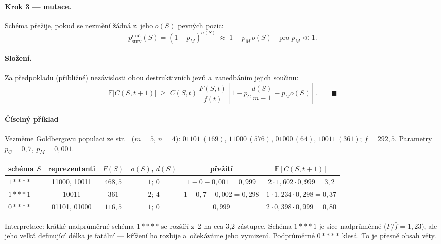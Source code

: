 \documentclass[11pt,a4paper]{article}
\theoremstyle{definition}
\begin{document}
\paragraph{Krok 3 --- mutace.} Schéma přežije, pokud se nezmění žádná z~jeho
$o(S)$ pevných pozic:
\[
p_{\mathrm{surv}}^{\mathrm{mut}}(S) = (1-p_M)^{o(S)} \;\approx\; 1 - p_M\,o(S)
\quad \text{pro } p_M \ll 1 .
\]

\paragraph{Složení.} Za předpokladu (přibližné) nezávislosti obou destruktivních
jevů a~zanedbáním jejich součinu:
\[
\mathbb{E}\big[C(S,t+1)\big] \;\ge\; C(S,t)\,\frac{F(S,t)}{\bar f(t)}
\left[1 - p_C \frac{d(S)}{m-1} - p_M o(S)\right]. \qquad\blacksquare
\]

\paragraph{Číselný příklad}

Vezměme Goldbergovu populaci ze str.~\pageref{ex:goldberg} ($m=5$, $n=4$):
$01101\,(169)$, $11000\,(576)$, $01000\,(64)$, $10011\,(361)$;
$\bar f = 292{,}5$. Parametry $p_C = 0{,}7$, $p_M = 0{,}001$.

\begin{center}
\begin{tabular}{@{}lccccc@{}}
\toprule
schéma $S$ & reprezentanti & $F(S)$ & $o(S)$, $d(S)$ & přežití & $\mathbb{E}[C(S,t{+}1)]$ \\
\midrule
$1{*}{*}{*}{*}$ & 11000, 10011 & $468{,}5$ & $1;\ 0$ &
  $1 - 0 - 0{,}001 = 0{,}999$ &
  $2 \cdot 1{,}602 \cdot 0{,}999 = 3{,}2$ \\
$1{*}{*}{*}1$ & 10011 & $361$ & $2;\ 4$ &
  $1 - 0{,}7 - 0{,}002 = 0{,}298$ &
  $1 \cdot 1{,}234 \cdot 0{,}298 = 0{,}37$ \\
$0{*}{*}{*}{*}$ & 01101, 01000 & $116{,}5$ & $1;\ 0$ &
  $0{,}999$ &
  $2 \cdot 0{,}398 \cdot 0{,}999 = 0{,}80$ \\
\bottomrule
\end{tabular}
\end{center}

Interpretace: krátké nadprůměrné schéma $1{*}{*}{*}{*}$ se rozšíří
z~2 na cca 3,2 zástupce. Schéma $1{*}{*}{*}1$ je sice nadprůměrné
($F/\bar f = 1{,}23$), ale jeho velká definující délka je fatální ---
křížení ho rozbije a~očekáváme jeho vymizení. Podprůměrné $0{*}{*}{*}{*}$
klesá. To je přesně obsah věty.
\end{document}
